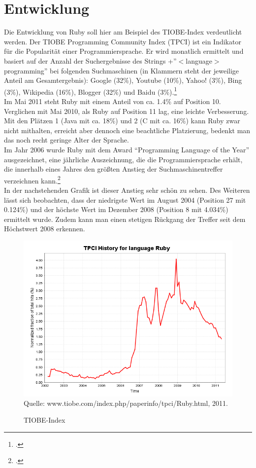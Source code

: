 \documentclass[a4paper, 11pt]{scrreprt}
\begin{document}
\section{Entwicklung}
Die Entwicklung von Ruby soll hier am Beispiel des TIOBE-Index verdeutlicht werden. Der TIOBE Programming Community Index (TPCI) ist ein Indikator für die Popularität einer Programmiersprache. Er wird monatlich ermittelt und basiert auf der Anzahl der Suchergebnisse des Strings +''$<$language$>$ programming'' bei folgenden Suchmaschinen (in Klammern steht der jeweilige Anteil am Gesamtergebnis): Google (32\%), Youtube (10\%), Yahoo! (3\%), Bing (3\%), Wikipedia (16\%), Blogger (32\%) und Baidu (3\%).\footcite[vgl.][]{tiobe_def}\\
Im Mai 2011 steht Ruby mit einem Anteil von ca. 1.4\% auf Position 10. Verglichen mit Mai 2010, als Ruby auf Position 11 lag, eine leichte Verbesserung. Mit den Plätzen 1 (Java mit ca. 18\%) und 2 (C mit ca. 16\%) kann Ruby zwar nicht mithalten, erreicht aber dennoch eine beachtliche Platzierung, bedenkt man das noch recht geringe Alter der Sprache.\\
Im Jahr 2006 wurde Ruby mit dem Award ``Programming Language of the Year'' ausgezeichnet, eine jährliche Auszeichnung, die die Programmiersprache erhält, die innerhalb eines Jahres den größten Anstieg der Suchmaschinentreffer verzeichnen kann.\footcite[vgl.][]{tiobe}\\
In der nachstehenden Grafik ist dieser Anstieg sehr schön zu sehen. Des Weiteren lässt sich beobachten, dass der niedrigste Wert im August 2004 (Position 27 mit 0.124\%) und der höchste Wert im Dezember 2008 (Position 8 mit 4.034\%) ermittelt wurde. Zudem kann man einen stetigen Rückgang der Treffer seit dem Höchstwert 2008 erkennen.

\begin{figure}[h]
\centering
\caption[TPCI History for language Ruby]{TIOBE-Index}
\includegraphics[width=425px]{TIOBE_ruby.png}\\
Quelle: www.tiobe.com/index.php/paperinfo/tpci/Ruby.html, 2011.
\end{figure}
\end{document}
